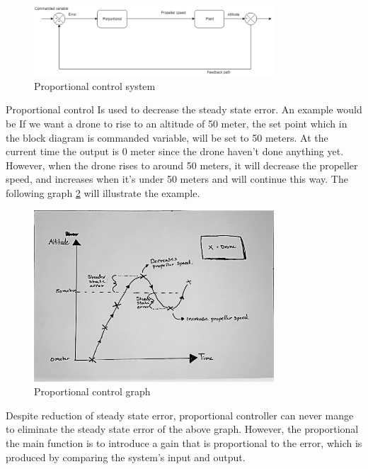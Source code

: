 \begin{figure}[H]
    \centering
    \includegraphics[width=0.8\textwidth]{figures/ch_design/PControl.png}
    \caption{Proportional control system}
    \label{fig:P_Control}
    \end{figure}
Proportional control Is used to decrease the steady state error. An example would be If we want a drone to rise to an altitude of 50 meter, the set point which in the block diagram is commanded variable, will be set to 50 meters. At the current time the output is 0 meter since the drone haven’t done anything yet. However, when the drone rises to around 50 meters, it will decrease the propeller speed, and increases when it’s under 50 meters and will continue this way. The following graph \ref{gra:P_Control_graph} will illustrate the example. 
\begin{figure}[H]
    \centering
    \includegraphics[width=0.8\textwidth]{figures/ch_design/PGraph.jpg}
    \caption{Proportional control graph}
    \label{gra:P_Control_graph}
    \end{figure}
Despite reduction of steady state error, proportional controller can never mange to eliminate the steady state error of the above graph. However, the proportional the main function is to introduce a gain that is proportional to the error, which is produced by comparing the system’s input and output.




